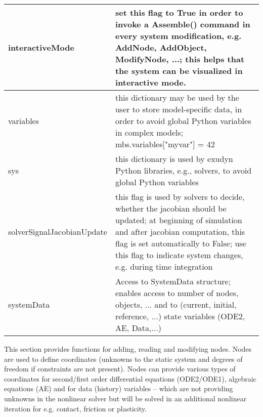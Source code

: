 \begin{center}
\begin{longtable}{| p{8cm} | p{8cm} |}
  interactiveMode & set this flag to True in order to invoke a Assemble() command in every system modification, e.g. AddNode, AddObject, ModifyNode, ...; this helps that the system can be visualized in interactive mode. \\ \hline  
  variables & this dictionary may be used by the user to store model-specific data, in order to avoid global Python variables in complex models; mbs.variables["myvar"] = 42 \\ \hline  
  sys & this dictionary is used by exudyn Python libraries, e.g., solvers, to avoid global Python variables \\ \hline 
  solverSignalJacobianUpdate & this flag is used by solvers to decide, whether the jacobian should be updated; at beginning of simulation and after jacobian computation, this flag is set automatically to False; use this flag to indicate system changes, e.g. during time integration  \\ \hline  
  systemData & Access to SystemData structure; enables access to number of nodes, objects, ... and to (current, initial, reference, ...) state variables (ODE2, AE, Data,...)\\ \hline  
\end{longtable}
\end{center}

\label{sec:mainsystem:node}
 This section provides functions for adding, reading and modifying nodes. Nodes are used to define coordinates (unknowns to the static system and degrees of freedom if constraints are not present). Nodes can provide various types of coordinates for second/first order differential equations (ODE2/ODE1), algebraic equations (AE) and for data (history) variables -- which are not providing unknowns in the nonlinear solver but will be solved in an additional nonlinear iteration for e.g. contact, friction or plasticity.

